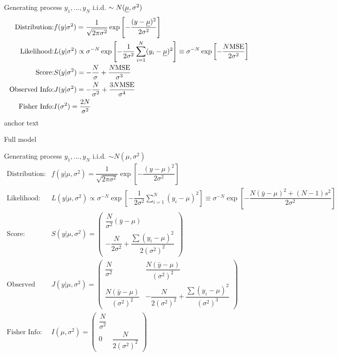 Generating process $ y_1,\ldots,y_N $ i.i.d. $ \sim N(\underline{\mu} ,\sigma ^2) $
\begin{align*}
    \text{Distribution:}&f(y|\sigma ^2  )=\dfrac{1}{\sqrt{2\pi\sigma ^2}}\exp\left[ -\dfrac{(y-\underline{\mu} )^2}{2\sigma ^2} \right]\\
    \text{Likelihood:}&L(y|\sigma ^2)\propto \sigma^{-N} \exp\left[ -\dfrac{1}{2\sigma ^2}\sum_{i=1}^N (y_i-\underline{\mu})^2 \right]\equiv \sigma^{-N} \exp\left[ -\dfrac{N\mathrm{MSE}}{2\sigma ^2}   \right] \\
    \text{Score:}&S(y|\sigma ^2)= -\dfrac{N}{\sigma }+\dfrac{N\mathrm{MSE} }{\sigma ^3}\\
    \text{Observed Info:}&J(y|\sigma ^2)= -\dfrac{N}{\sigma ^2}+\dfrac{3N\mathrm{MSE} }{\sigma ^4}\\
    \text{Fisher Info:}&I(\sigma^2 )=\dfrac{2N}{\sigma ^2}
\end{align*}
\hypertarget{NormalWithMeanConjugate}{anchor text}

\begin{point}
    Full model
\end{point}

Generating process $ y_1,\ldots,y_N $ i.i.d. $ \sim N(\mu  ,\sigma ^2) $
\begin{align*}
    \text{Distribution:}&f(y|\mu ,\sigma ^2  )=\dfrac{1}{\sqrt{2\pi\sigma ^2}}\exp\left[ -\dfrac{(y-\mu  )^2}{2\sigma ^2} \right]\\
    \text{Likelihood:}&L(y|\mu ,\sigma ^2)\propto \sigma^{-N} \exp\left[ -\dfrac{1}{2\sigma ^2}\sum_{i=1}^N (y_i-\mu )^2 \right]\equiv \sigma^{-N} \exp\left[ -\dfrac{N(\bar{y}-\mu )^2+(N-1)s^2}{2\sigma ^2}   \right] \\
    \text{Score:}&S(y|\mu ,\sigma ^2)= \begin{pmatrix}
        \dfrac{N}{\sigma ^2}(\bar{y}-\mu )\\
        -\dfrac{N}{2\sigma ^2}+\dfrac{\sum (y_i-\mu )^2}{2(\sigma ^2)^2}
    \end{pmatrix}\\
    \text{Observed Info:}&J(y|\mu ,\sigma ^2)= \begin{pmatrix}
        \dfrac{N}{\sigma ^2}&\dfrac{N(\bar{y}-\mu )}{(\sigma ^2)^2}\\
        \dfrac{N(\bar{y}-\mu )}{(\sigma ^2)^2}&-\dfrac{N }{2(\sigma ^2)^2}+\dfrac{\sum (y_i-\mu )^2}{(\sigma ^2)^3}
    \end{pmatrix}\\
    \text{Fisher Info:}&I(\mu ,\sigma^2 )=\begin{pmatrix}
        \dfrac{N}{\sigma ^2}&\\
        0&\dfrac{N}{2(\sigma ^2)^2}
    \end{pmatrix}
\end{align*}

